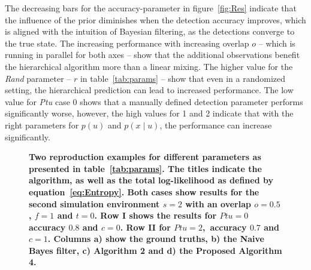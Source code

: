 \documentclass[twocolumn,letterpaper]{IEEEAerospaceCLS}  %
\begin{document}
The decreasing bars for the accuracy-parameter in figure~\ref{fig:Res} indicate that the influence of the prior diminishes when the detection accuracy improves, which is aligned with the intuition of Bayesian filtering, as the detections converge to the true state. The increasing performance with increasing overlap $o$ -- which is running in parallel for both axes -- show that the additional observations benefit the hierarchical algorithm more than a linear mixing. The higher value for the \emph{Rand} parameter -- $r$ in table~\ref{tab:params} -- show that even in a randomized setting, the hierarchical prediction can lead to increased performance. The low value for \emph{Ptu} case 0 shows that a manually defined detection parameter performs significantly worse, however, the high values for 1 and 2 indicate that with the right parameters for $p(u)$ and $p(x\mid u)$, the performance can increase significantly.
\begin{figure}
    \centering
    \caption{\bf{
        Two reproduction examples for different parameters as presented in table~\ref{tab:params}. The titles indicate the algorithm, as well as the total log-likelihood as defined by equation~\ref{eq:Entropy}. Both cases show results for the second simulation environment $s=2$ with an overlap $o=0.5$, $f=1$ and $t=0$. Row I shows the results for $Ptu=0$ accuracy $0.8$ and $c=0$. Row II for $Ptu=2$,~accuracy $0.7$ and $c=1$. Columns a) show the ground truths, b) the Naive Bayes filter, c) Algorithm 2 and d) the Proposed Algorithm 4. 
    }}
    \label{fig:SampRes}
\end{figure}
\end{document}
